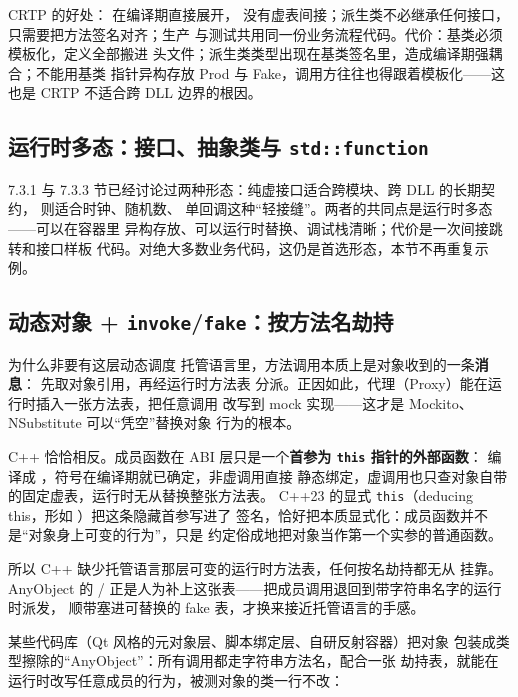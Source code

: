 \documentclass[12pt,a4paper,fontset=fandol]{ctexbook}
\begin{document}
CRTP 的好处： 在编译期直接展开，
没有虚表间接；派生类不必继承任何接口，只需要把方法签名对齐；生产
与测试共用同一份业务流程代码。代价：基类必须模板化，定义全部搬进
头文件；派生类类型出现在基类签名里，造成编译期强耦合；不能用基类
指针异构存放 Prod 与 Fake，调用方往往也得跟着模板化——这也是 CRTP
不适合跨 DLL 边界的根因。

\subsection{运行时多态：接口、抽象类与 \texttt{std::function}}

7.3.1 与 7.3.3 节已经讨论过两种形态：纯虚接口适合跨模块、跨 DLL
的长期契约， 则适合时钟、随机数、
单回调这种“轻接缝”。两者的共同点是运行时多态——可以在容器里
异构存放、可以运行时替换、调试栈清晰；代价是一次间接跳转和接口样板
代码。对绝大多数业务代码，这仍是首选形态，本节不再重复示例。

\subsection{动态对象 + \texttt{invoke}/\texttt{fake}：按方法名劫持}

\begin{note}{为什么非要有这层动态调度}
托管语言里，方法调用本质上是对象收到的一条\textbf{消息}：
 先取对象引用，再经运行时方法表
分派。正因如此，代理（Proxy）能在运行时插入一张方法表，把任意调用
改写到 mock 实现——这才是 Mockito、NSubstitute 可以“凭空”替换对象
行为的根本。

C++ 恰恰相反。成员函数在 ABI 层只是一个\textbf{首参为 \texttt{this}
指针的外部函数}： 编译成
，符号在编译期就已确定，非虚调用直接
静态绑定，虚调用也只查对象自带的固定虚表，运行时无从替换整张方法表。
C++23 的显式 \texttt{this}（deducing this，形如
）把这条隐藏首参写进了
签名，恰好把本质显式化：成员函数并不是“对象身上可变的行为”，只是
约定俗成地把对象当作第一个实参的普通函数。

所以 C++ 缺少托管语言那层可变的运行时方法表，任何按名劫持都无从
挂靠。AnyObject 的 /\allowbreak{}
正是人为补上这张表——把成员调用退回到带字符串名字的运行时派发，
顺带塞进可替换的 fake 表，才换来接近托管语言的手感。
\end{note}

某些代码库（Qt 风格的元对象层、脚本绑定层、自研反射容器）把对象
包装成类型擦除的“AnyObject”：所有调用都走字符串方法名，配合一张
劫持表，就能在运行时改写任意成员的行为，被测对象的类一行不改：
\end{document}
